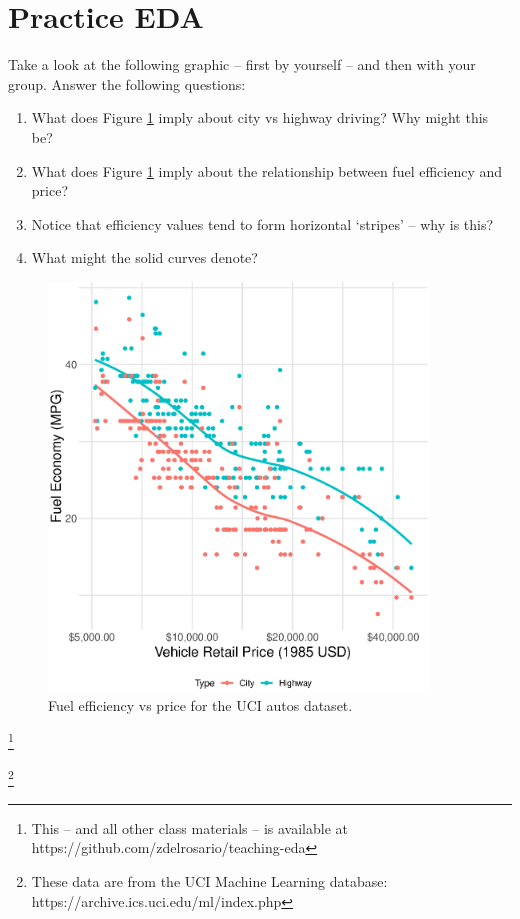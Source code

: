 \documentclass{article}
\newcommand\blfootnote[1]{%
  \begingroup
  \renewcommand\thefootnote{}\footnote{#1}%
  \addtocounter{footnote}{-1}%
  \endgroup
}
\begin{document}
\section{Practice EDA}
Take a look at the following graphic -- first by yourself -- and then with your
group. Answer the following questions:

\begin{enumerate}
\item What does Figure \ref{fig:mpg-vs-usd} imply about city vs highway driving?
  Why might this be?
\item What does Figure \ref{fig:mpg-vs-usd} imply about the relationship between
  fuel efficiency and price?
\item Notice that efficiency values tend to form horizontal `stripes' -- why is
  this?
\item What might the solid curves denote?
\end{enumerate}

\begin{figure}[!ht]
  \includegraphics[width=0.90\textwidth]{../images/mpg_vs_usd}
  \caption{Fuel efficiency vs price for the UCI autos dataset.}
  \label{fig:mpg-vs-usd}
\end{figure}

\blfootnote{This -- and all other class materials -- is available at
  https://github.com/zdelrosario/teaching-eda}

\blfootnote{These data are from the UCI Machine Learning database:
  https://archive.ics.uci.edu/ml/index.php}
\end{document}

